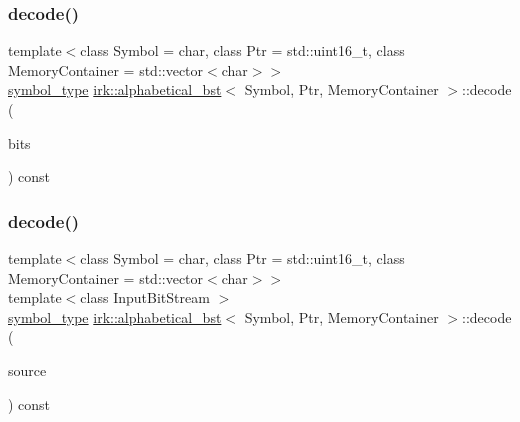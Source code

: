 \subsubsection{\texorpdfstring{decode()}{decode()}\hspace{0.1cm}{\footnotesize\ttfamily [1/2]}}
{\footnotesize\ttfamily template$<$class Symbol = char, class Ptr = std\+::uint16\+\_\+t, class Memory\+Container = std\+::vector$<$char$>$$>$ \\
\mbox{\hyperlink{classirk_1_1alphabetical__bst_a296ccb8fa9fa9dce3b3c3beab0a5ca28}{symbol\+\_\+type}} \mbox{\hyperlink{classirk_1_1alphabetical__bst}{irk\+::alphabetical\+\_\+bst}}$<$ Symbol, Ptr, Memory\+Container $>$\+::decode (\begin{DoxyParamCaption}\item[{const boost\+::dynamic\+\_\+bitset$<$ unsigned char $>$ \&}]{bits }\end{DoxyParamCaption}) const\hspace{0.3cm}{\ttfamily [inline]}}

\mbox{\label{classirk_1_1alphabetical__bst_ad16d9e58c78eafe81f08c20171973cd7}} 
\subsubsection{\texorpdfstring{decode()}{decode()}\hspace{0.1cm}{\footnotesize\ttfamily [2/2]}}
{\footnotesize\ttfamily template$<$class Symbol = char, class Ptr = std\+::uint16\+\_\+t, class Memory\+Container = std\+::vector$<$char$>$$>$ \\
template$<$class Input\+Bit\+Stream $>$ \\
\mbox{\hyperlink{classirk_1_1alphabetical__bst_a296ccb8fa9fa9dce3b3c3beab0a5ca28}{symbol\+\_\+type}} \mbox{\hyperlink{classirk_1_1alphabetical__bst}{irk\+::alphabetical\+\_\+bst}}$<$ Symbol, Ptr, Memory\+Container $>$\+::decode (\begin{DoxyParamCaption}\item[{Input\+Bit\+Stream \&}]{source }\end{DoxyParamCaption}) const\hspace{0.3cm}{\ttfamily [inline]}}

\mbox{\label{classirk_1_1alphabetical__bst_a788eae986e42bf08ba2566927416a367}} 
